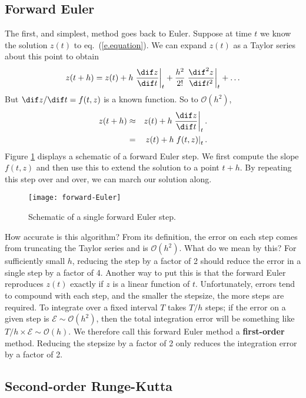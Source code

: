 \subsection{Forward Euler}

The first, and simplest, method goes back to Euler.
Suppose at time $t$ we know the solution $z(t)$ to eq.~(\ref{e.equation}). We can expand $z(t)$ as a Taylor series about this point to obtain
\[ z(t+h) = z(t) + h \left.\frac{\dif z}{\dif t}\right|_{t} + \frac{h^{2}}{2!} \left.\frac{\dif^{2} z}{\dif t^{2}}\right|_{t} + \ldots \]
But $\dif z/\dif t = f(t,z)$ is a known function. So to $\mathcal{O}(h^{2})$,
\begin{eqnarray}
	z(t+h) &\approx& z(t) + h \left.\frac{\dif z}{\dif t}\right|_{t}. \nonumber\\
		&=& z(t) + h \left.f(t,z)\right|_{t}.
\label{e.fEuler}
\end{eqnarray}
Figure \ref{f.forward-Euler} displays a schematic of a forward Euler step. We first compute the slope $f(t,z)$ and then use this to extend the solution to a point $t+h$. By repeating this step over and over, we can march our solution along.

\begin{figure}[htb]
\texttt{[image: forward-Euler]}
\caption{\label{f.forward-Euler}Schematic of a single forward Euler step.}
\end{figure}

How accurate is this  algorithm? From its definition, the error on each step comes from truncating the Taylor series and is $\mathcal{O}(h^{2})$. What do we mean by this? For sufficiently small $h$, reducing the step by a factor of 2 should reduce the error in a single step by a factor of 4. Another way to put this is that the forward Euler reproduces $z(t)$ exactly if $z$ is a linear function of $t$.
Unfortunately, errors tend to compound with each step, and the smaller the stepsize, the more steps are required. To integrate over a fixed interval $T$ takes $T/h$ steps; if the error on a given step is $\mathcal{E}\sim \mathcal{O}(h^{2})$, then the total integration error will be something like $T/h \times \mathcal{E} \sim \mathcal{O}(h)$.  We therefore call this forward Euler method a \textbf{first-order} method. Reducing the stepsize by a factor of 2 only reduces the integration error by a factor of 2.

\subsection{Second-order Runge-Kutta}

